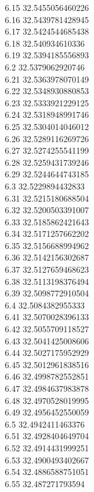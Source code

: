 {6.15	32.5455056460226\\
6.16	32.5439781428945\\
6.17	32.5424544685438\\
6.18	32.540934610336\\
6.19	32.5394185556893\\
6.2	32.5379062920746\\
6.21	32.5363978070149\\
6.22	32.5348930880853\\
6.23	32.5333921229125\\
6.24	32.5318948991746\\
6.25	32.5304014046012\\
6.26	32.5289116269726\\
6.27	32.5274255541199\\
6.28	32.5259431739246\\
6.29	32.5244644743185\\
6.3	32.5229894432833\\
6.31	32.5215180688504\\
6.32	32.5200503391007\\
6.33	32.5185862421643\\
6.34	32.5171257662202\\
6.35	32.5156688994962\\
6.36	32.5142156302687\\
6.37	32.5127659468623\\
6.38	32.5113198376494\\
6.39	32.5098772910504\\
6.4	32.5084382955333\\
6.41	32.5070028396133\\
6.42	32.5055709118527\\
6.43	32.5041425008606\\
6.44	32.5027175952929\\
6.45	32.5012961838516\\
6.46	32.4998782552851\\
6.47	32.4984637983878\\
6.48	32.4970528019995\\
6.49	32.4956452550059\\
6.5	32.4942411463376\\
6.51	32.4928404649704\\
6.52	32.4914431999251\\
6.53	32.4900493402667\\
6.54	32.4886588751051\\
6.55	32.487271793594\\
}
